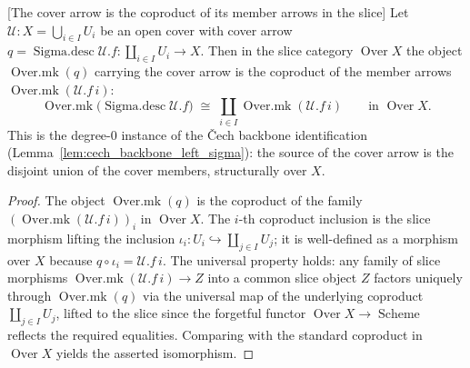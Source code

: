 \begin{lemma}

[The cover arrow is the coproduct of its member arrows in the slice]
  \label{lem:coverArrow_over_sigma}
  Let \(\mathcal{U} : X = \bigcup_{i \in I} U_i\) be an open cover with cover arrow
  \(q = \operatorname{Sigma.desc}\mathcal{U}.f : \coprod_{i \in I} U_i \to X\). Then in the slice
  category \(\operatorname{Over} X\) the object \(\operatorname{Over.mk}(q)\) carrying the cover arrow is
  the coproduct of the member arrows \(\operatorname{Over.mk}(\mathcal{U}.f\,i)\):
  \[
    \operatorname{Over.mk}\bigl(\operatorname{Sigma.desc}\mathcal{U}.f\bigr)
      \;\cong\;
    \coprod_{i \in I} \operatorname{Over.mk}(\mathcal{U}.f\,i)
      \qquad\text{in } \operatorname{Over} X.
  \]
  This is the degree-\(0\) instance of the {\v C}ech backbone identification
  (Lemma~\ref{lem:cech_backbone_left_sigma}): the source of the cover arrow is the disjoint union of the
  cover members, structurally over \(X\).
\end{lemma}
\begin{proof}
  The object \(\operatorname{Over.mk}(q)\) is the coproduct of the family
  \((\operatorname{Over.mk}(\mathcal{U}.f\,i))_i\) in \(\operatorname{Over} X\). The \(i\)-th
  coproduct inclusion is the slice morphism lifting the inclusion
  \(\iota_i : U_i \hookrightarrow \coprod_{j \in I} U_j\); it is well-defined as a morphism over
  \(X\) because \(q \circ \iota_i = \mathcal{U}.f\,i\). The universal property holds: any family
  of slice morphisms \(\operatorname{Over.mk}(\mathcal{U}.f\,i) \to Z\) into a common slice object
  \(Z\) factors uniquely through \(\operatorname{Over.mk}(q)\) via the universal map of the
  underlying coproduct \(\coprod_{j \in I} U_j\), lifted to the slice since the forgetful functor
  \(\operatorname{Over} X \to \operatorname{Scheme}\) reflects the required equalities.
  Comparing with the standard coproduct in \(\operatorname{Over} X\) yields the asserted isomorphism.
\end{proof}

